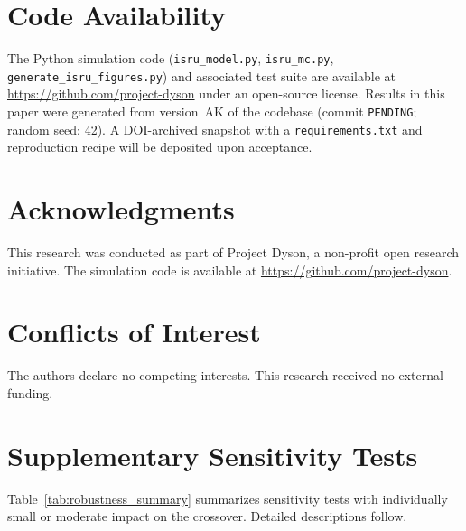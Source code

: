 \documentclass[preprint,12pt]{elsarticle}
\begin{document}
\section*{Code Availability}

The Python simulation code (\texttt{isru\_model.py}, \texttt{isru\_mc.py}, \texttt{generate\_isru\_figures.py}) and associated test suite are available at \url{https://github.com/project-dyson} under an open-source license. Results in this paper were generated from version~AK of the codebase (commit \texttt{PENDING}; random seed: 42). A DOI-archived snapshot with a \texttt{requirements.txt} and reproduction recipe will be deposited upon acceptance.


\section*{Acknowledgments}

This research was conducted as part of Project Dyson, a non-profit open research initiative. The simulation code is available at \url{https://github.com/project-dyson}.

\section*{Conflicts of Interest}

The authors declare no competing interests. This research received no external funding.

\appendix
\section{Supplementary Sensitivity Tests}
\label{sec:appendix_sensitivity}

Table~\ref{tab:robustness_summary} summarizes sensitivity tests with individually small or moderate impact on the crossover. Detailed descriptions follow.
\end{document}
